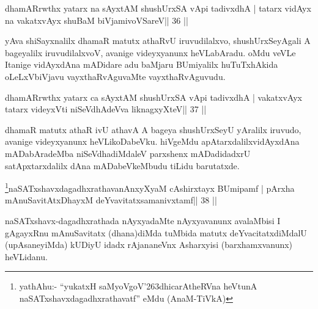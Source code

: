 
\begin{shl}
dhamARrwthx yatarx na sAyxtAM shushUrxSA vA\s pi tadivxdhA |
tatarx vidAyx na vakatxvAyx shuBaM biVjamivoVSareV\hfill || 36 ||
\end{shl}

\begin{artha}
yAva shiSayxnalilx dhamaR matutx athaRvU iruvudilalxvo, shushUrxSeyAgali A bageyalilx iruvudilalxvoV, avanige videyxyanunx heVLabAradu. oMdu veVLe Itanige vidAyxdAna mADidare adu baMjaru BUmiyalilx huTuTxhAkida oLeLxVbiVjavu vayxthaRvAguvaMte vayxthaRvAguvudu.
\end{artha} 


\begin{shl}
dhamARrwthx yatarx ca sAyxtAM shushUrxSA vA\s pi tadivxdhA |
vakatxvAyx tatarx videyxVti niSeVdhAdeVva liknagxyXteV\hfill || 37 ||
\end{shl}

\begin{artha}
dhamaR matutx athaR ivU athavA A bageya shushUrxSeyU yAralilx iruvudo,  avanige videyxyanunx heVLikoDabeVku. hiVgeMdu apAtarxdalilx\break vidAyxdAna mADabAradeMba niSeVdhadiMdaleV parxshenx mADadidadxrU satApxtarxdalilx dAna mADabeVkeMbudu tiLidu barutatxde.
\end{artha}


\begin{shl}
\footnote{yathAhu:- ``yukatxH saMyoVgoV\char'263dhicarAtheRVna  heVtunA naSATxshavxdagadhxrathavatf'' eMdu (AnaM-TiVkA)}naSATxshavxdagadhxrathavanAnxyXyaM cA\s\s shirxtayx BUmipamf |
pArxha mAnuSavitAtxDhayxM deYvavitatxsamanivxtamf\hfill || 38 ||
\end{shl}

\begin{artha}
naSATxshavx-dagadhxrathada nAyxyadaMte nAyxyavanunx avalaMbisi I gAgayxRnu mAnuSavitatx (dhana)diMda tuMbida matutx deYvacitatxdiMdalU (upAsaneyiMda) kUDiyU idadx rAjananeVnx Asharxyisi (barxhamxvanunx) heVLidanu.
\end{artha}


